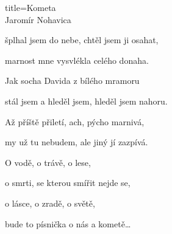 \begin{song}{title=\centering Kometa \\\normalsize Jaromír Nohavica \vspace*{-0.3cm}}
{\begin{minipage}[t]{0.48\textwidth}
	šplhal jsem do nebe, chtěl jsem ji osahat,
	
	marnost mne vysvlékla celého donaha.
	
\end{minipage}\begin{minipage}[t]{0.5\textwidth}\setlength{\parindent}{0.45cm}\vspace*{0.55cm}  %

\sloka
	Jak socha Davida z bílého mramoru
	
	stál jsem a hleděl jsem, hleděl jsem nahoru.
	
	Až příště přiletí, ach, pýcho marnivá,
	
	my už tu nebudem, ale jiný jí zazpívá.


	O vodě, o trávě, o lese,
	
	o smrti, se kterou smířit nejde se,
	
	o lásce, o zradě, o světě,
	
	bude to písnička o nás a kometě\elipsa\dots

\end{minipage}
}
\setcounter{Slokočet}{0}
\end{song}


